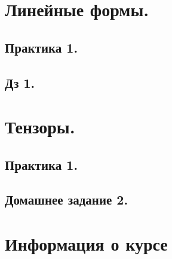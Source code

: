 \maketitle
\tableofcontents

\newpage
\section{Линейные формы.}
\subsection{Практика 1.}

\newpage
\subsection{Дз 1.}

\newpage
\section{Тензоры.}
\subsection{Практика 1.}

\newpage
\subsection{Домашнее задание 2.}

\newpage



\newpage
\section{Информация о курсе}

